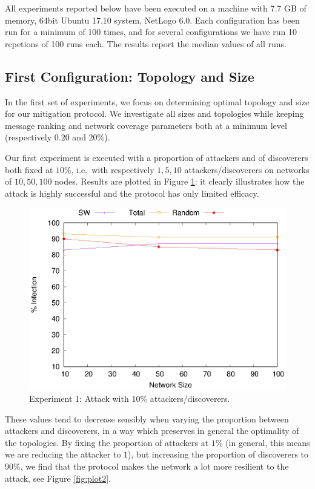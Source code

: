 \documentclass[compsoc, conference, letterpaper, 10pt, times]{IEEEtran}
\begin{document}
All experiments reported below have been executed on a machine with 7.7 GB of memory, 64bit Ubuntu 17.10 system, NetLogo 6.0. Each configuration has been run for a minimum of 100 times, and for several configurations we have run 10 repetions of 100 runs each. The results report the median values of all runs.

\subsection{First Configuration: Topology and Size}

In the first set of experiments, we focus on determining optimal topology and size for our mitigation protocol. We investigate all sizes and topologies while keeping message ranking and network coverage parameters both at a minimum level (respectively $0.20$ and $20\%$).

Our first experiment is executed with a proportion of attackers and of discoverers both fixed at $10\%$, i.e.\ with respectively $1,5,10$ attackers/discoverers on networks of $10,50,100$ nodes. Results are plotted in Figure \ref{fig:plot1}: it clearly illustrates how the attack is highly successful and the protocol has only limited efficacy.

\begin{figure}
\includegraphics[scale=0.70]{1stconfig}
\caption{Experiment 1: Attack with $10\%$ attackers/discoverers.}\label{fig:plot1}
\end{figure}
These values tend to decrease sensibly when varying the proportion between attackers and discoverers, in a way which preserves in general the optimality of the topologies. By fixing the proportion of attackers at $1\%$ (in general, this means we are reducing the attacker to $1$), but increasing the proportion of discoverers to $90\%$, we find that the protocol makes the network a lot more resilient to the attack, see Figure \ref{fig:plot2}.
\end{document}
